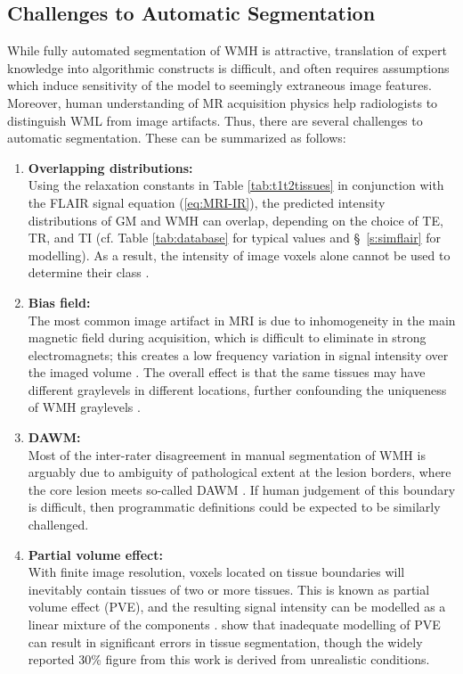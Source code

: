 \subsection{Challenges to Automatic Segmentation}\label{ss:autochallenges}
While fully automated segmentation of WMH is attractive, translation of expert knowledge into algorithmic constructs is difficult, and often requires assumptions which induce sensitivity of the model to seemingly extraneous image features. Moreover, human understanding of MR acquisition physics help radiologists to distinguish WML from image artifacts. Thus, there are several challenges to automatic segmentation. These can be summarized as follows:
\begin{enumerate}[itemsep=0pt,topsep=0pt]
  \item \label{chauto:overlap}     \textbf{Overlapping distributions:} \\
  Using the relaxation constants in Table \ref{tab:t1t2tissues} in conjunction with the FLAIR signal equation (\ref{eq:MRI-IR}), the predicted intensity distributions of GM and WMH can overlap, depending on the choice of TE, TR, and TI (cf. Table \ref{tab:database} for typical values and \S\ \ref{s:simflair} for modelling). As a result, the intensity of image voxels alone cannot be used to determine their class \cite{Mortazavi2012}.
  \item \label{chauto:bias}        \textbf{Bias field:} \\
  The most common image artifact in MRI is due to inhomogeneity in the main magnetic field during acquisition, which is difficult to eliminate in strong electromagnets; this creates a low frequency variation in signal intensity over the imaged volume \cite{Juntu2005}. The overall effect is that the same tissues may have different graylevels in different locations, further confounding the uniqueness of WMH graylevels \cite{Wardlaw2015}.
  \item \label{chauto:dawm}        \textbf{DAWM:} \\
  Most of the inter-rater disagreement in manual segmentation of WMH is arguably due to ambiguity of pathological extent at the lesion borders, where the core lesion meets so-called DAWM \cite{Ge2003}. If human judgement of this boundary is difficult, then programmatic definitions could be expected to be similarly challenged.
  \item \label{chauto:pva}         \textbf{Partial volume effect:} \\
  With finite image resolution, voxels located on tissue boundaries will inevitably contain tissues of two or more tissues. This is known as partial volume effect (PVE), and the resulting signal intensity can be modelled as a linear mixture of the components \cite{Santago1995}. \citeauthor{Niessen1999} \cite{Niessen1999} show that inadequate modelling of PVE can result in significant errors in tissue segmentation, though the widely reported 30\% figure from this work is derived from unrealistic conditions.

\end{enumerate}
